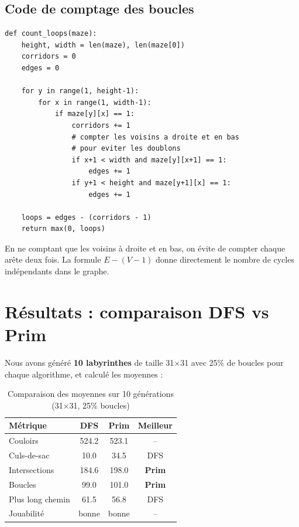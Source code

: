 \documentclass[12pt,a4paper]{article}
\begin{document}
\subsection{Code de comptage des boucles}

\begin{lstlisting}[caption={Estimation du nombre de boucles}]
def count_loops(maze):
    height, width = len(maze), len(maze[0])
    corridors = 0
    edges = 0
    
    for y in range(1, height-1):
        for x in range(1, width-1):
            if maze[y][x] == 1:
                corridors += 1
                # compter les voisins a droite et en bas
                # pour eviter les doublons
                if x+1 < width and maze[y][x+1] == 1:
                    edges += 1
                if y+1 < height and maze[y+1][x] == 1:
                    edges += 1
    
    loops = edges - (corridors - 1)
    return max(0, loops)
\end{lstlisting}

En ne comptant que les voisins à droite et en bas, on évite de compter chaque arête deux fois. La formule $E - (V-1)$ donne directement le nombre de cycles indépendants dans le graphe.

\section{Résultats : comparaison DFS vs Prim}

Nous avons généré \textbf{10 labyrinthes} de taille 31$\times$31 avec 25\% de boucles pour chaque algorithme, et calculé les moyennes :

\begin{table}[h]
\centering
\begin{tabular}{lccc}
\toprule
\textbf{Métrique} & \textbf{DFS} & \textbf{Prim} & \textbf{Meilleur} \\
\midrule
Couloirs           & 524.2 & 523.1 & -- \\
Culs-de-sac        & 10.0  & 34.5  & DFS \\
Intersections      & 184.6 & 198.0 & \textbf{Prim} \\
Boucles            & 99.0  & 101.0 & \textbf{Prim} \\
Plus long chemin   & 61.5  & 56.8  & DFS \\
Jouabilité         & bonne & bonne & -- \\
\bottomrule
\end{tabular}
\caption{Comparaison des moyennes sur 10 générations (31$\times$31, 25\% boucles)}
\label{tab:comparaison}
\end{table}
\end{document}
